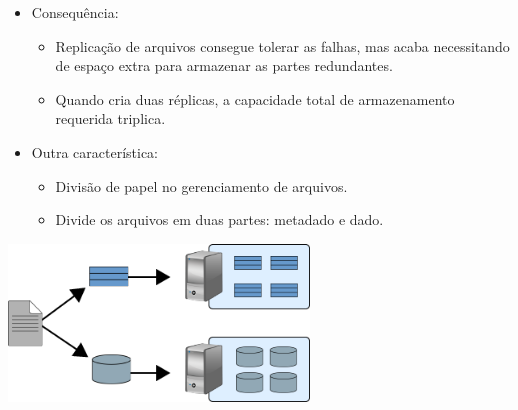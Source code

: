 \begin{frame}{}
	\begin{itemize}
	\item Consequência:
		
	\begin{itemize}
	\item Replicação de arquivos consegue tolerar as falhas, mas acaba necessitando de espaço extra para armazenar as partes redundantes.

	\item Quando cria duas réplicas, a capacidade total de armazenamento requerida triplica. 

	\end{itemize}
	

	\end{itemize}
\end{frame}


\begin{frame}{}
	\begin{itemize}
	\item Outra característica:
	
	\begin{itemize}
		\item Divisão de papel no gerenciamento de arquivos.
		
		\item Divide os arquivos em duas partes: metadado e dado.

	\end{itemize}
	\end{itemize}
	\begin{center}
	\includegraphics[width=0.6\textwidth]{imagens/meta}
	\end{center}
\end{frame}


